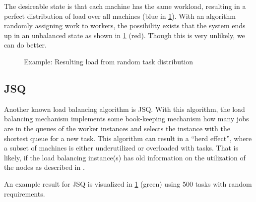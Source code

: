 The desireable state is that each machine has the same workload, resulting in a
perfect distribution of load over all machines (blue in \ref{fig:algo:random}).
With an algorithm randomly assigning work to workers, the possibility exists
that the system ends up in an unbalanced state as shown in \ref{fig:algo:random}
(red).
Though this is very unlikely, we can do better.

\begin{figure}
	\centering
	\label{fig:algo:random}
	\caption{Example: Resulting load from random task distribution}
\end{figure}

\subsection{\ac{JSQ}}

Another known load balancing algorithm is \ac{JSQ}.
With this algorithm, the load balancing mechanism implements some book-keeping
mechanism how many jobs are in the queues of the worker instances and selects
the instance with the shortest queue for a new task.
This algorithm can result in a ``herd effect'', where a subset of machines is
either underutilized or overloaded with tasks.
That is likely, if the load balancing instance(s) has old information on the
utilization of the nodes as described in \cite{inpSLoadInfo}.

An example result for \ac{JSQ} is visualized in \ref{fig:algo:random} (green)
using 500 tasks with random requirements.

